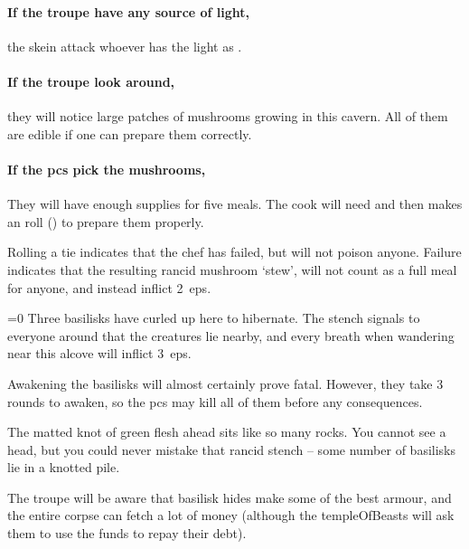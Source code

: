 \begin{multicols}{2}
\paragraph{If the troupe have any source of light,}
the skein attack whoever has the light as .

\skeinSwarm

\paragraph{If the troupe look around,}
they will notice large patches of mushrooms growing in this cavern.
All of them are edible if one can prepare them correctly.

\paragraph{If the \glspl{pc} pick the mushrooms,}
They will have enough supplies for five meals.
The cook will need  and then makes an  roll (\tn[10]) to prepare them properly.

Rolling a tie indicates that the chef has failed, but will not poison anyone.
Failure indicates that the resulting rancid mushroom `stew', will not count as a full meal for anyone, and instead inflict 2~\glspl{ep}.


\metroMapDistances[b]


\ifnum\value{temperature}=0
  Three \glspl{basilisk} have curled up here to hibernate.
  The stench signals to everyone around that the creatures lie nearby, and every breath when wandering near this alcove will inflict 3~\glspl{ep}.

  Awakening the \glspl{basilisk} will almost certainly prove fatal.
  However, they take 3 rounds to awaken, so the \glspl{pc} may kill all of them before any consequences.

  \begin{boxtext}
    The matted knot of green flesh ahead sits like so many rocks.
    You cannot see a head, but you could never mistake that rancid stench -- some number of \glspl{basilisk} lie in a knotted pile.
  \end{boxtext}

  The troupe will be aware that \gls{basilisk} hides make some of the best armour, and the entire corpse can fetch a lot of money (although the \gls{templeOfBeasts} will ask them to use the funds to repay their debt).


\end{multicols}

